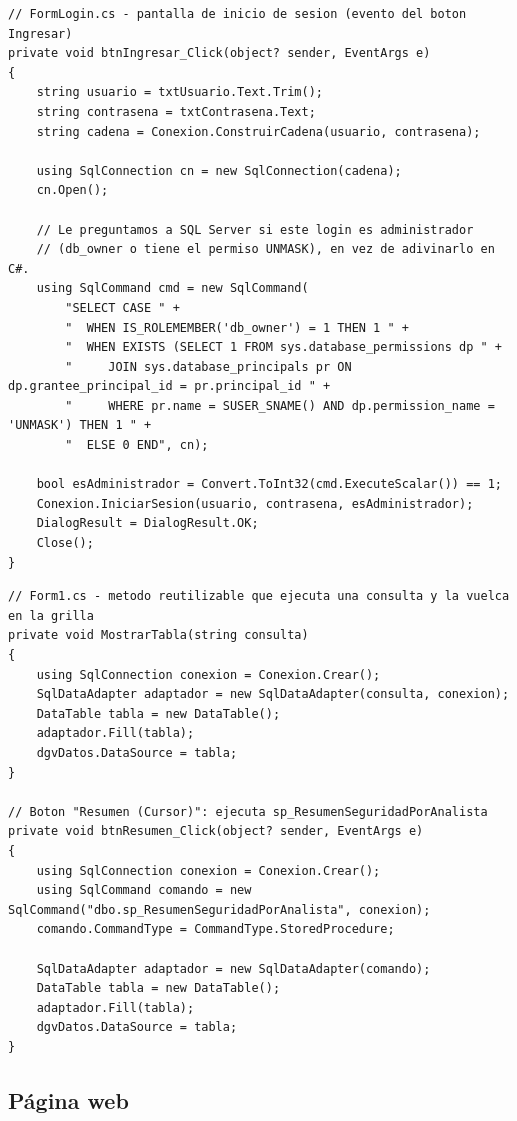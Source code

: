 \documentclass[11pt,a4paper]{article}
\begin{document}
\begin{lstlisting}[style=codestyle]
// FormLogin.cs - pantalla de inicio de sesion (evento del boton Ingresar)
private void btnIngresar_Click(object? sender, EventArgs e)
{
    string usuario = txtUsuario.Text.Trim();
    string contrasena = txtContrasena.Text;
    string cadena = Conexion.ConstruirCadena(usuario, contrasena);

    using SqlConnection cn = new SqlConnection(cadena);
    cn.Open();

    // Le preguntamos a SQL Server si este login es administrador
    // (db_owner o tiene el permiso UNMASK), en vez de adivinarlo en C#.
    using SqlCommand cmd = new SqlCommand(
        "SELECT CASE " +
        "  WHEN IS_ROLEMEMBER('db_owner') = 1 THEN 1 " +
        "  WHEN EXISTS (SELECT 1 FROM sys.database_permissions dp " +
        "     JOIN sys.database_principals pr ON dp.grantee_principal_id = pr.principal_id " +
        "     WHERE pr.name = SUSER_SNAME() AND dp.permission_name = 'UNMASK') THEN 1 " +
        "  ELSE 0 END", cn);

    bool esAdministrador = Convert.ToInt32(cmd.ExecuteScalar()) == 1;
    Conexion.IniciarSesion(usuario, contrasena, esAdministrador);
    DialogResult = DialogResult.OK;
    Close();
}
\end{lstlisting}

\begin{lstlisting}[style=codestyle]
// Form1.cs - metodo reutilizable que ejecuta una consulta y la vuelca en la grilla
private void MostrarTabla(string consulta)
{
    using SqlConnection conexion = Conexion.Crear();
    SqlDataAdapter adaptador = new SqlDataAdapter(consulta, conexion);
    DataTable tabla = new DataTable();
    adaptador.Fill(tabla);
    dgvDatos.DataSource = tabla;
}

// Boton "Resumen (Cursor)": ejecuta sp_ResumenSeguridadPorAnalista
private void btnResumen_Click(object? sender, EventArgs e)
{
    using SqlConnection conexion = Conexion.Crear();
    using SqlCommand comando = new SqlCommand("dbo.sp_ResumenSeguridadPorAnalista", conexion);
    comando.CommandType = CommandType.StoredProcedure;

    SqlDataAdapter adaptador = new SqlDataAdapter(comando);
    DataTable tabla = new DataTable();
    adaptador.Fill(tabla);
    dgvDatos.DataSource = tabla;
}
\end{lstlisting}

\subsection{Página web}
\end{document}
